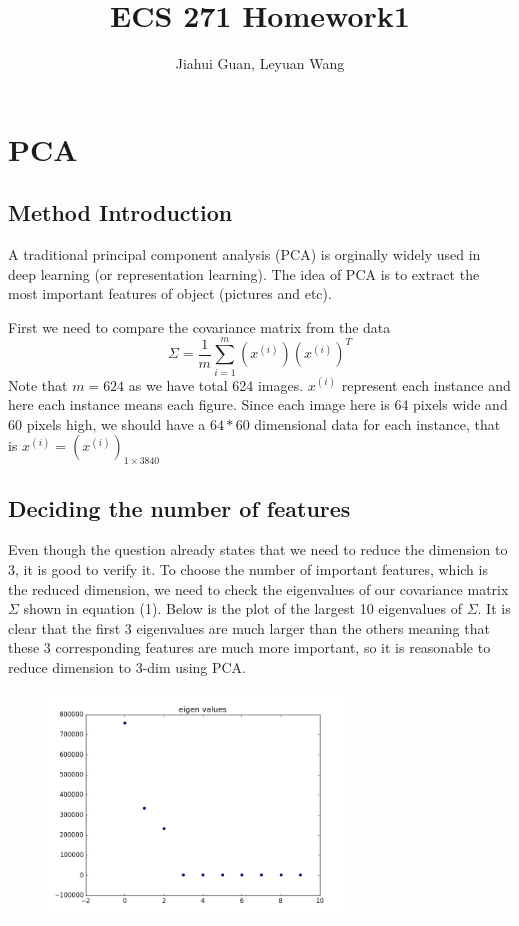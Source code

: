 \documentclass{article}
\title{ECS 271 Homework1}
\date{\vspace{-5ex}}
\begin{document}
\author{Jiahui Guan, Leyuan Wang}
\maketitle


\section{PCA}
\subsection{Method Introduction}
A traditional principal component analysis (PCA) is orginally widely used in deep learning (or representation learning). The idea of PCA is to extract the most important features of object (pictures and etc). 

First we need to compare the covariance matrix from the data 
\begin{equation}
\Sigma=\dfrac{1}{m}\sum_{i=1}^m (x^{(i)})(x^{(i)})^T
\end{equation}
Note that $m=624$ as we have total 624 images. $x^{(i)}$ represent each instance and here each instance means each figure. Since each image  here is 64 pixels wide and 60 pixels high, we should have a $64*60$ dimensional data for each instance, that is $x^{(i)}=(x^{(i)})_{1\times 3840}$

\subsection{Deciding the number of features}
Even though the question already states that we need to reduce the dimension to 3, it is good to verify it. To choose the number of important features, which is the reduced dimension, we need to check the eigenvalues of our covariance matrix $\Sigma$ shown in equation (1). Below is the plot of the largest 10 eigenvalues of $\Sigma$. It is clear that the first 3 eigenvalues are much larger than the others meaning that these 3 corresponding features are much more important, so it is reasonable to  reduce dimension to 3-dim using PCA. 
\begin{figure}[H]
\centering
\includegraphics[width=0.6\linewidth, height=6cm]{eigen}
\caption{}
\label{fig:larynx}
\end{figure}
\end{document}
